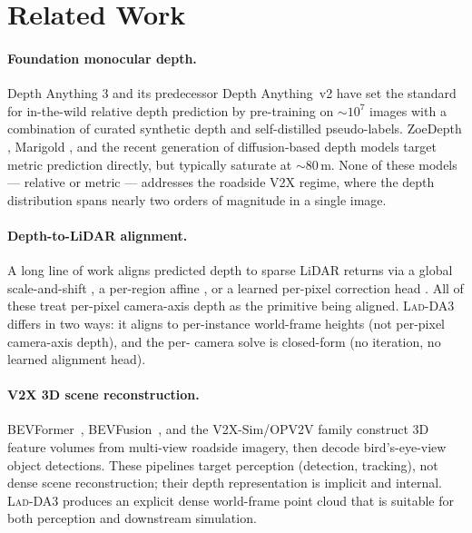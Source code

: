 \documentclass[10pt,twocolumn,letterpaper]{article}
\newcommand{\ourmethod}{\textsc{Lad-DA3}\xspace}
\begin{document}
\section{Related Work}
\label{sec:related}

\paragraph{Foundation monocular depth.} Depth Anything 3
\cite{depthanything3} and its predecessor Depth Anything~v2
\cite{depthanything2} have set the standard for in-the-wild relative
depth prediction by pre-training on $\sim$$10^7$ images with a
combination of curated synthetic depth and self-distilled
pseudo-labels. ZoeDepth \cite{zoedepth}, Marigold \cite{marigold}, and
the recent generation of diffusion-based depth models target metric
prediction directly, but typically saturate at $\sim$$80$\,m. None of
these models — relative or metric — addresses the roadside V2X regime,
where the depth distribution spans nearly two orders of magnitude in a
single image.

\paragraph{Depth-to-LiDAR alignment.} A long line of work aligns
predicted depth to sparse LiDAR returns via a global scale-and-shift
\cite{midas3}, a per-region affine \cite{regionaffinedepth}, or a
learned per-pixel correction head \cite{learneddepthcalibration}. All
of these treat per-pixel camera-axis depth as the primitive being
aligned. \ourmethod{} differs in two ways: it aligns to per-instance
world-frame heights (not per-pixel camera-axis depth), and the per-
camera solve is closed-form (no iteration, no learned alignment head).

\paragraph{V2X 3D scene reconstruction.} BEVFormer~\cite{bevformer},
BEVFusion~\cite{bevfusion}, and the V2X-Sim/OPV2V family
\cite{v2xsim,opv2v} construct 3D feature volumes from multi-view
roadside imagery, then decode bird's-eye-view object detections.
These pipelines target perception (detection, tracking), not dense
scene reconstruction; their depth representation is implicit and
internal. \ourmethod{} produces an explicit dense world-frame point
cloud that is suitable for both perception and downstream simulation.
\end{document}
